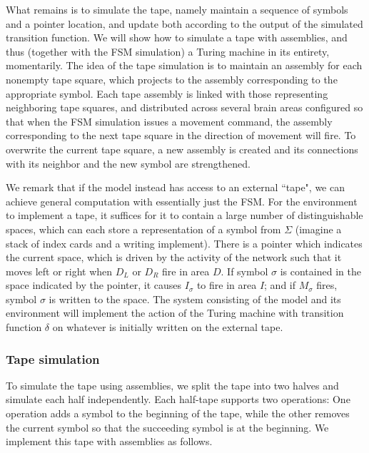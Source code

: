 \documentclass[12pt,nosubfloats]{alt2024} %
\newcommand{\1}{\mathbbm{1}}
\begin{document}
What remains is to simulate the tape, namely maintain a sequence of symbols and a pointer location, and update both according to the output of the simulated transition function.
We will show how to simulate a tape with assemblies, and thus (together with the FSM simulation) a Turing machine in its entirety, momentarily. The idea of the tape simulation is to maintain an assembly for each nonempty tape square, which projects to the assembly corresponding to the appropriate symbol. Each tape assembly is linked with those representing neighboring tape squares, and distributed across several brain areas configured so that when the FSM simulation issues a movement command, the assembly corresponding to the next tape square in the direction of movement will fire. To overwrite the current tape square, a new assembly is created and its connections with its neighbor and the new symbol are strengthened. 

We remark that if the model instead has access to an external ``tape", we can achieve general computation with essentially just the FSM.  For the environment to implement a tape, it suffices for it to contain a large number of distinguishable spaces, which can each store a representation of a symbol from $\Sigma$ (imagine a stack of index cards and a writing implement). There is a pointer which indicates the current space, which is driven by the activity of the network such that it moves left or right when $D_L$ or $D_R$ fire in area $D$. If symbol $\sigma$ is contained in the space indicated by the pointer, it causes $I_\sigma$ to fire in area $I$; and if $M_\sigma$ fires, symbol $\sigma$ is written to the space.
 The system consisting of the model and its environment will implement the action of the Turing machine with transition function $\delta$ on whatever is initially written on the external tape.

\subsubsection*{Tape simulation}
To simulate the tape using assemblies, we split the tape into two halves and simulate each half independently. 
Each half-tape supports two operations: One operation adds a symbol to the beginning of the tape, while the other removes the current symbol so that the succeeding symbol is at the beginning. We implement this tape with assemblies as follows. 
\end{document}
